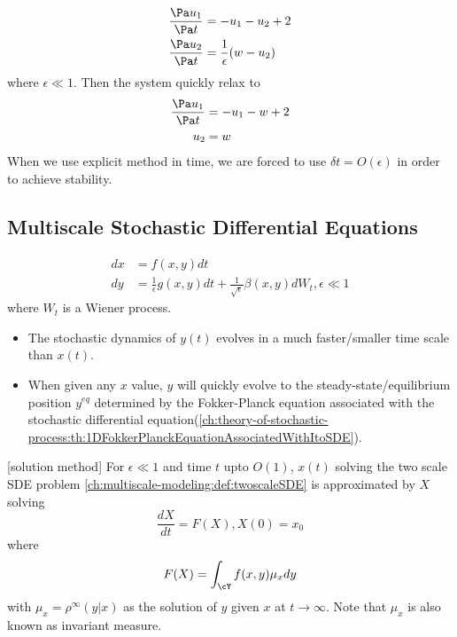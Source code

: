 \begin{refsection}
\begin{example}
	\begin{align*}
	\frac{\Pa u_1}{\Pa t} &= -u_1 -u_2 + 2\\
	\frac{\Pa u_2}{\Pa t} &= \frac{1}{\epsilon} (w - u_2)
	\end{align*}
where $\epsilon \ll 1$. Then the system quickly relax to 
	\begin{align*}
	\frac{\Pa u_1}{\Pa t} &= -u_1 -w + 2\\
	u_2 &= w
\end{align*}
When we use explicit method in time, we are forced to use $\delta t = O(\epsilon)$ in order to achieve stability.
\end{example}



\subsection{Multiscale Stochastic Differential Equations}
\begin{definition}\cite[128]{pavliotis2008multiscale}\label{ch:multiscale-modeling:def:twoscaleSDE}
	\begin{align*}
	dx &= f(x,y)dt\\
	dy &= \frac{1}{\epsilon}g(x,y)dt + \frac{1}{\sqrt{\epsilon}} \beta(x,y) dW_t,\epsilon \ll 1
	\end{align*}
	where $W_t$ is a Wiener process.
\end{definition}


\begin{remark}[implications]
	\begin{itemize}
		\item The stochastic dynamics of $y(t)$ evolves in a much faster/smaller time scale than $x(t)$.
		\item When given any $x$ value, $y$ will quickly evolve to the steady-state/equilibrium position $y^{eq}$ determined by the Fokker-Planck equation associated with the stochastic differential equation(\autoref{ch:theory-of-stochastic-process:th:1DFokkerPlanckEquationAssociatedWithItoSDE}). 
	\end{itemize}
\end{remark}

\begin{theorem}\cite[146]{pavliotis2008multiscale}\label{ch:multiscale-modeling:th:largetimescalesolutionformultiscaleSDE}[solution method]
For $\epsilon \ll 1$ and time $t$ upto $O(1)$, $x(t)$ solving the two scale SDE problem \autoref{ch:multiscale-modeling:def:twoscaleSDE} is approximated by $X$ solving
$$\frac{dX}{dt} = F(X), X(0) = x_0$$
where
$$F(X) = \int_{\cY} f(x,y) \mu_x dy$$
with $\mu_x = \rho^{\infty}(y|x)$ as the solution of $y$ given $x$ at $t\to \infty$. 
Note that $\mu_x$ is also known as invariant measure.
\end{theorem}



\end{refsection}
